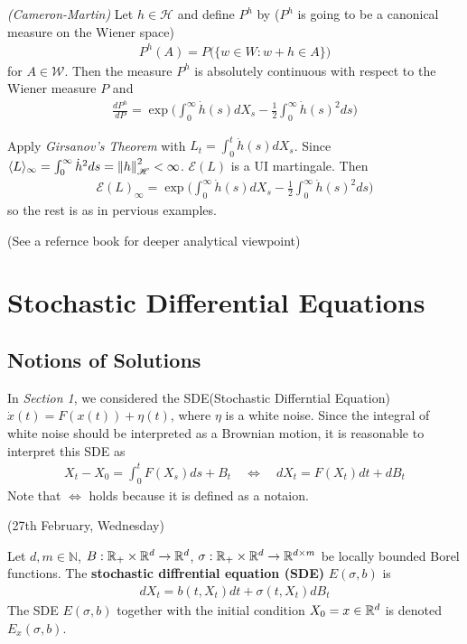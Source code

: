 \documentclass[10pt,a4paper]{article}
\newenvironment{proof}
{\begin{changemargin}{0.5cm}{0.5cm} 
	}%
	{\end{changemargin}
}
\newenvironment{p}
{\begin{proof} 
	}%
	{\end{proof}
}
\begin{document}
\thm \emph{(Cameron-Martin)} Let $h\in \mathscr{H}$ and define $P^h$ by ($P^h$ is going to be a canonical measure on the Wiener space)
\begin{align*}
P^h(A) = P \big( \{ w\in W : w+ h \in A \} \big)
\end{align*}
for $A\in \mathscr{W}$. Then the measure $P^h$ is absolutely continuous with respect to the Wiener measure $P$ and
\begin{align*}
\frac{dP^h}{dP} = \exp \Big( \int_0^{\infty} \dot{h}(s) dX_s - \frac{1}{2}\int_0^{\infty} \dot{h}(s)^2 ds \Big)
\end{align*}
\begin{p}
\pf Apply \emph{Girsanov's Theorem} with $L_t = \int_0^{t} \dot{h}(s) dX_s$. Since $\langle L \rangle_{\infty} = \int_0^{\infty} \dot{h}^2 ds = \snorms{h}{\mathscr{H}}^2 < \infty$. $\mathscr{E}(L)$ is a UI martingale. Then
\begin{align*}
\mathscr{E}(L)_{\infty} = \exp \Big( \int_0^{\infty} \dot{h}(s) dX_s - \frac{1}{2}\int_0^{\infty} \dot{h}(s)^2 ds \Big)
\end{align*}
so the rest is as in pervious examples.

\eop
\end{p}

(See a refernce book for deeper analytical viewpoint)


\section{Stochastic Differential Equations}

\subsection{Notions of Solutions}

In \emph{Section 1}, we considered the SDE(Stochastic Differntial Equation) $\dot{x}(t) =F(x(t)) + \eta(t)$, where $\eta$ is a white noise. Since the integral of white noise should be interpreted as a Brownian motion, it is reasonable to interpret this SDE as
\begin{align*}
X_t - X_0 = \int_0^t F(X_s) ds + B_t \quad \Leftrightarrow \quad dX_t = F(X_t) dt + dB_t 
\end{align*}
Note that $\Leftrightarrow$ holds because it is defined as a notaion.
\s

\newday

(27th February, Wednesday)
\s

 Let $d, m\in \mathbb{N}$, $B: \mathbb{R}_+ \times \mathbb{R}^d \rightarrow \mathbb{R}^d$, $\sigma : \mathbb{R}_+ \times \mathbb{R}^d \rightarrow \mathbb{R}^{d\times m}$ be locally bounded Borel functions. The \textbf{stochastic diffrential equation (SDE)} $E(\sigma, b)$ is
\begin{align*}
dX_t = b(t, X_t) dt + \sigma(t, X_t) dB_t
\end{align*}
The SDE $E(\sigma, b)$ together with the initial condition $X_0 = x\in \mathbb{R}^d$ is denoted $E_x(\sigma, b)$.
\s
\end{document}
